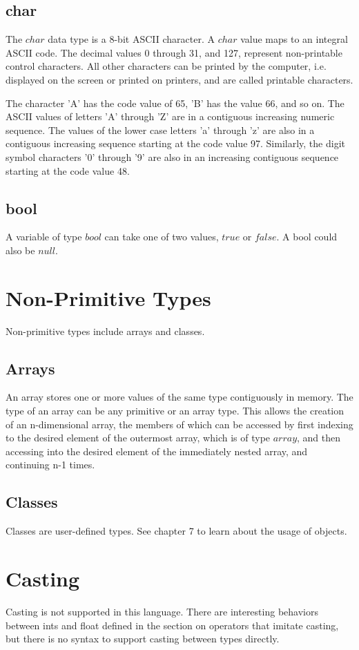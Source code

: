 \begin{homeworkProblem}
	\subsection{char}

	The $char$ data type is a 8-bit ASCII character. A $char$ value maps to an integral ASCII code. The decimal values 0 through 31, and 127, represent non-printable control characters. All other characters can be printed by the computer, i.e. displayed on the screen or printed on printers, and are called printable characters.

    The character 'A' has the code value of 65, 'B' has the value 66, and so on. The ASCII values of letters 'A' through 'Z' are in a contiguous increasing numeric sequence. The values of the lower case letters 'a' through 'z' are also in a contiguous increasing sequence starting at the code value 97. Similarly, the digit symbol characters '0' through '9' are also in an increasing contiguous sequence starting at the code value 48.

	\subsection{bool}

	A variable of type $bool$ can take one of two values, $true$ or $false$. A bool could also be $null$.\\

	\section{Non-Primitive Types}
    Non-primitive types include arrays and classes.
	\subsection{Arrays}
	An array stores one or more values of the same type contiguously in memory. The type of an array can be any primitive or an array type. This allows the creation of an n-dimensional array, the members of which can be accessed by first indexing to the desired element of the outermost array, which is of type $array$, and then accessing into the desired element of the immediately nested array, and continuing n-1 times.

	\subsection{Classes}
	
	Classes are user-defined types. See chapter 7 to learn about the usage of objects.

	\section{Casting}
	Casting is not supported in this language. There are interesting behaviors between ints and float defined in the section on operators that imitate casting, but there is no syntax to support casting between types directly. 

\end{homeworkProblem}
